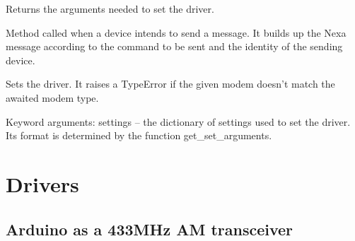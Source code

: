 \documentclass[letterpaper,10pt,english]{sphinxmanual}
\begin{document}
\begin{fulllineitems}
\begin{fulllineitems}
\end{fulllineitems}


\begin{fulllineitems}
\label{implementation_examples:protocols.oregon.Oregon.get_set_arguments}
Returns the arguments needed to set the driver.

\end{fulllineitems}


\begin{fulllineitems}
\label{implementation_examples:protocols.oregon.Oregon.send_command}
Method called when a device intends to send a message.
It builds up the Nexa message according to the command 
to be sent and the identity of the sending device.

\end{fulllineitems}


\begin{fulllineitems}
\label{implementation_examples:protocols.oregon.Oregon.set}
Sets the driver. It raises a TypeError if the given modem doesn't
match the awaited modem type.

Keyword arguments:
settings -- the dictionary of settings used to set the driver. Its 
format is determined by the function get\_set\_arguments.

\end{fulllineitems}


\end{fulllineitems}



\section{Drivers}
\label{implementation_examples:drivers}

\subsection{Arduino as a 433MHz AM transceiver}
\label{implementation_examples:arduino-as-a-433mhz-am-transceiver}
\end{document}
